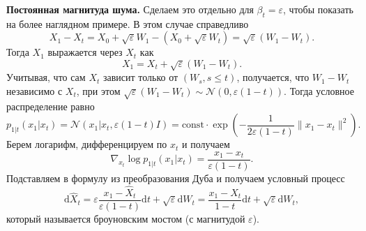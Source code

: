 \documentclass[12pt]{article}
\theoremstyle{definition}
\begin{document}
\noindent\textbf{Постоянная магнитуда шума.} Сделаем это отдельно для $\beta_t = \varepsilon$, чтобы показать на более наглядном примере. В этом случае справедливо
\[
    X_1 - X_t = X_0 + \sqrt{\varepsilon} W_1 - (X_0 + \sqrt{\varepsilon} W_t) = \sqrt{\varepsilon} (W_1 - W_t).
\]
Тогда $X_1$ выражается через $X_t$ как
\[
    X_1 = X_t + \sqrt{\varepsilon} (W_1 - W_t).
\]
Учитывая, что сам $X_t$ зависит только от $(W_s, s \leq t)$, получается, что $W_1 - W_t$ независимо с $X_t$, при этом $\sqrt{\varepsilon}(W_1 - W_t) \sim \mathcal{N}(0, \varepsilon(1 - t))$. Тогда условное распределение равно
\[
    p_{1 | t}(x_1 | x_t) = \mathcal{N}(x_1 | x_t, \varepsilon (1 - t) I) = \text{const} \cdot \exp\left(-\frac{1}{2 \varepsilon (1 - t)} \| x_1 - x_t \|^2 \right).
\]
Берем логарифм, дифференцируем по $x_t$ и получаем
\[
    \nabla_{x_t} \log p_{1 | t}(x_1 | x_t) = \frac{x_1 - x_t}{\varepsilon (1 - t)}.
\]
Подставляем в формулу из преобразования Дуба и получаем условный процесс
\[
    \mathrm{d} \hat{X}_t = \varepsilon \frac{x_1 - \hat{X}_t}{\varepsilon(1 - t)} \mathrm{d} t + \sqrt{\varepsilon} \mathrm{d} W_t = \frac{x_1 - \hat{X}_t}{1 - t} \mathrm{d} t + \sqrt{\varepsilon} \mathrm{d} W_t,
\]
который называется броуновским мостом (с магнитудой $\varepsilon$).\\
\end{document}
